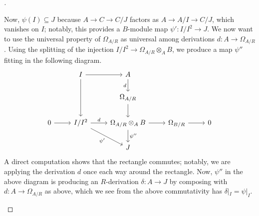 \documentclass[../notes.tex]{subfiles}
\begin{document}
\begin{proof}[]
\begin{itemize}
		Now, $\psi(I)\subseteq J$ because $A\to C\to C/J$ factors as $A\to A/I\to C/J$, which vanishes on $I$; notably, this provides a $B$-module map $\psi'\colon I/I^2\to J$. We now want to use the universal property of $\Omega_{A/R}$ as universal among derivations $d\colon A\to\Omega_{A/R}$. Using the splitting of the injection $I/I^2\to\Omega_{A/R}\otimes_AB$, we produce a map $\psi''$ fitting in the following diagram.
		\[\begin{tikzcd}
			& I & A \\
			&& {\Omega_{A/R}} \\
			0 & {I/I^2} & {\Omega_{A/R}\otimes_AB} & {\Omega_{B/R}} & 0 \\
			&& J
			\arrow["{\psi'}"', from=3-2, to=4-3]
			\arrow["{\psi''}", from=3-3, to=4-3]
			\arrow[from=3-1, to=3-2]
			\arrow["d", from=3-2, to=3-3]
			\arrow[from=3-3, to=3-4]
			\arrow[from=3-4, to=3-5]
			\arrow["d"', from=1-3, to=2-3]
			\arrow[from=2-3, to=3-3]
			\arrow[from=1-2, to=1-3]
			\arrow[from=1-2, to=3-2]
		\end{tikzcd}\]
		A direct computation shows that the rectangle commutes; notably, we are applying the derivation $d$ once each way around the rectangle. Now, $\psi''$ in the above diagram is producing an $R$-derivation $\delta\colon A\to J$ by composing with $d\colon A\to\Omega_{A/R}$ as above, which we see from the above commutativity has $\delta|_I=\psi|_I$.


\end{itemize}
\end{proof}
\end{document}
